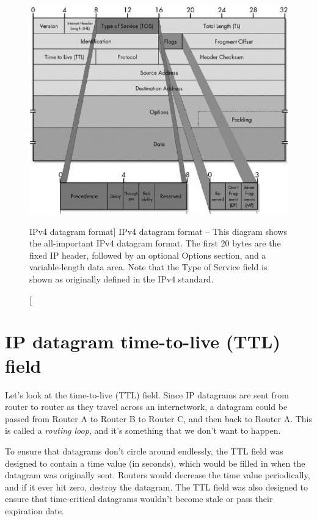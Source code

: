 \begin{figure}
   \centering
   \includegraphics[width=.7\textwidth]{images/ipv4-datagram-format.jpg}
   \caption
      [IPv4 datagram format]
      {IPv4 datagram format -- This diagram shows the all-important IPv4 datagram format.
      The first 20 bytes are the fixed IP header, followed by an optional Options section, and a variable-length data area.
      Note that the Type of Service field is shown as originally defined in the IPv4 standard.}
   \label{fig:ipv4-datagram-format}
\end{figure}



\section{IP datagram time-to-live (TTL) field}
\label{sec:ip-datagram-ttl}

Let's look at the time-to-live (TTL) field.
Since IP datagrams are sent from router to router as they travel across an internetwork, a datagram could be passed from Router A to Router B to Router C, and then back to Router A.
This is called a \emph{routing loop}, and it's something that we don't want to happen.

To ensure that datagrams don't circle around endlessly, the TTL field was designed to contain a time value (in seconds),
which would be filled in when the datagram was originally sent.
Routers would decrease the time value periodically, and if it ever hit zero, destroy the datagram.
The TTL field was also designed to ensure that time-critical datagrams wouldn't become stale or pass their expiration date.

